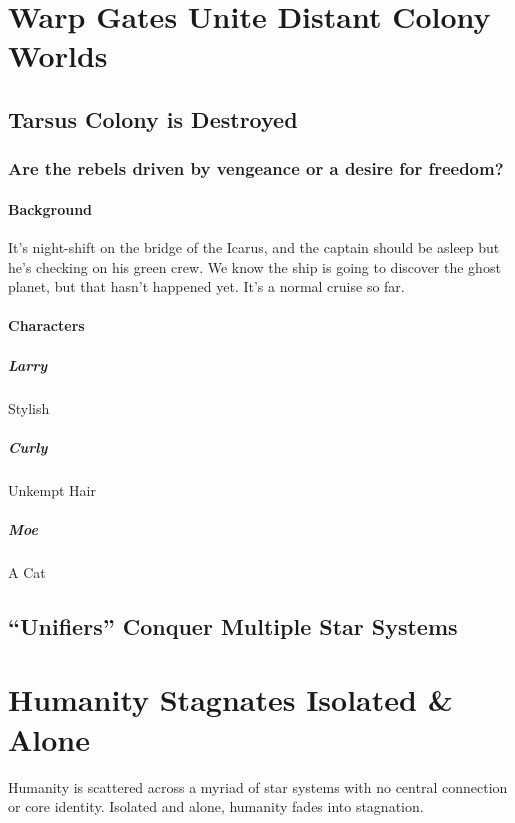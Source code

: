 \documentclass[letterpaper,twoside,openany]{book}
\newcommand{\light}{\textopenbullet}
\newcommand{\dark}{\textbullet}
\begin{document}
\chapter{Warp Gates Unite Distant Colony Worlds \light}

\section{Tarsus Colony is Destroyed \dark}

\subsection{Are the rebels driven by vengeance or a desire for freedom?}

\subsubsection{Background}
It's night-shift on the bridge of the Icarus, and the captain should be asleep but he's checking on his green crew.
We know the ship is going to discover the ghost planet, but that hasn't happened yet.
It's a normal cruise so far.

\subsubsection{Characters}
\paragraph{Larry}
Stylish
\paragraph{Curly}
Unkempt Hair
\paragraph{Moe}
A Cat

\section{``Unifiers'' Conquer Multiple Star Systems \dark}

\chapter{Humanity Stagnates Isolated \& Alone \dark}
Humanity is scattered across a myriad of star systems with no central connection or core identity.
Isolated and alone, humanity fades into stagnation.
\end{document}
